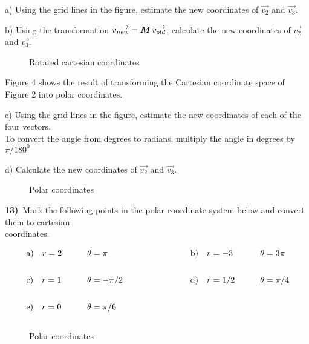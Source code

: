 \documentclass[11pt]{article}
\begin{document}
\hspace*{5mm} a) Using the grid lines in the figure, estimate the new coordinates of $\vec{v_2}$ and $\vec{v_3}$.

\hspace*{5mm} b) Using the transformation $\protect\overrightarrow{ v_{new}}= \mbox{\boldmath $M$} \, \protect\overrightarrow{ v_{old}}$, calculate the new coordinates 
                    of $\vec{v_2}$ and $\vec{v_3}$. \svs

\begin{figure}[!ht]
   \centerline{\epsfxsize=10cm } \svs
    \caption{Rotated cartesian coordinates} 
\end{figure} \vs

Figure 4 shows the result of transforming the Cartesian coordinate space of Figure 2 into polar coordinates.

\hspace*{5mm} c) Using the grid lines in the figure, estimate the new coordinates of each of the four vectors. \\
\hspace*{9mm} To convert the angle from degrees to radians, multiply the angle in degrees by $\pi/180^0$

\hspace*{5mm} d) Calculate the new coordinates of $\vec{v_2}$ and $\vec{v_3}$.\svs

\begin{figure}[!ht]
   \centerline{\epsfxsize=10cm } \svs
    \caption{Polar coordinates}
\end{figure} \vs

\newpage

\textbf{13)}\  Mark the following points in the polar coordinate system below and convert them to cartesian \\
\hspace*{6mm} coordinates.

$\begin{array}{llcll}
\qquad \mbox{a)} \quad r = 2 &\qquad \theta=\pi \vspace*{.35cm} & \qquad  \qquad & 
\qquad \mbox{b)} \quad r = -3 &\qquad \theta=3\pi \vspace*{.35cm}\\
\qquad \mbox{c)} \quad r = 1 &\qquad \theta=-\pi /2\vspace*{.35cm} & \qquad \qquad &
\qquad \mbox{d)} \quad r = 1/2& \qquad \theta=\pi /4 \vspace*{.35cm}\\
\qquad \mbox{e)} \quad r = 0 &\qquad \theta=\pi /6\vspace*{.35cm}
\end{array}$

\begin{figure}[!ht]
   \centerline{\epsfxsize=10cm } \svs
    \caption{Polar coordinates}
\end{figure} \vs
\end{document}
